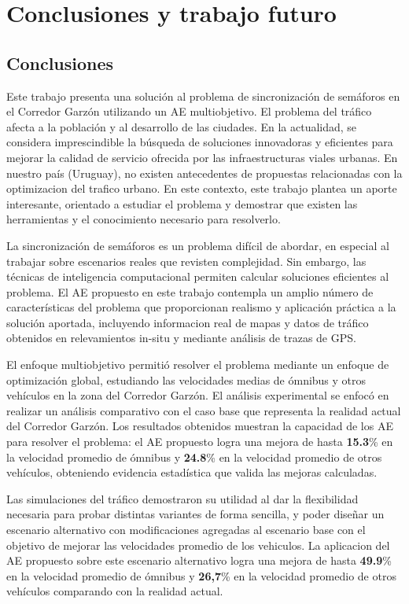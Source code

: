 \chapter{Conclusiones y trabajo futuro}

\section{Conclusiones}
Este trabajo presenta una solución al problema de sincronización de semáforos en el Corredor Garzón utilizando un AE multiobjetivo. El problema del tráfico afecta a la población y al desarrollo de las ciudades. En la actualidad, se considera imprescindible la búsqueda de soluciones innovadoras y eficientes para mejorar la calidad de servicio ofrecida por las infraestructuras viales urbanas. En nuestro país (Uruguay), no existen antecedentes de propuestas relacionadas con la optimizacion del trafico urbano. En este contexto, este trabajo plantea un aporte interesante, orientado a estudiar el problema y demostrar que existen las herramientas y el conocimiento necesario para resolverlo.

La sincronización de semáforos es un problema difícil de abordar, en especial al trabajar sobre escenarios reales que revisten complejidad. Sin embargo, las técnicas de inteligencia computacional permiten calcular soluciones eficientes al problema. 
El AE propuesto en este trabajo contempla un amplio número de características del problema que proporcionan realismo y aplicación práctica a la solución aportada, incluyendo informacion real de mapas y datos de tráfico obtenidos en relevamientos in-situ y mediante análisis de trazas de GPS.

El enfoque multiobjetivo permitió resolver el problema mediante un enfoque de optimización global, estudiando las velocidades medias de ómnibus y otros vehículos en la zona del Corredor Garzón. El análisis experimental se enfocó en realizar un análisis comparativo con el caso base que representa la realidad actual del Corredor Garzón. Los resultados obtenidos muestran la capacidad de los AE para resolver el problema: el AE propuesto logra una mejora de hasta \textbf{15.3}\% en la velocidad promedio de ómnibus y \textbf{24.8}\% en la velocidad promedio de otros vehículos, obteniendo evidencia estadística que valida las mejoras calculadas. 

Las simulaciones del tráfico demostraron su utilidad al dar la flexibilidad necesaria para probar distintas variantes de forma sencilla, y poder diseñar un escenario alternativo con modificaciones agregadas al escenario base con el objetivo de mejorar las velocidades promedio de los vehiculos. La aplicacion del AE propuesto sobre este escenario alternativo logra una mejora de hasta \textbf{49.9}\% en la velocidad promedio de ómnibus y \textbf{26,7}\% en la velocidad promedio de otros vehículos comparando con la realidad actual.

